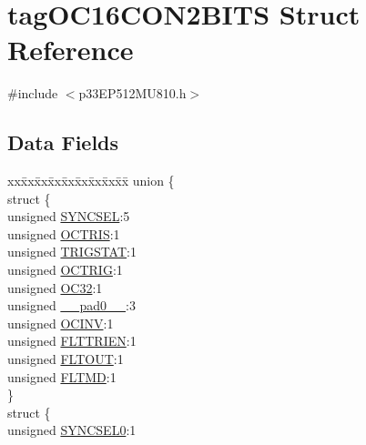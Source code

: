 \hypertarget{structtag_o_c16_c_o_n2_b_i_t_s}{}\section{tag\+O\+C16\+C\+O\+N2\+B\+I\+TS Struct Reference}
\label{structtag_o_c16_c_o_n2_b_i_t_s}


{\ttfamily \#include $<$p33\+E\+P512\+M\+U810.\+h$>$}

\subsection*{Data Fields}
\begin{DoxyCompactItemize}
\item 
\begin{tabbing}
xx\=xx\=xx\=xx\=xx\=xx\=xx\=xx\=xx\=\kill
union \{\\
\>struct \{\\
\>\>unsigned \hyperlink{structtag_o_c16_c_o_n2_b_i_t_s_a35fbbe11485c2615ed27535b62c3fa35}{SYNCSEL}:5\\
\>\>unsigned \hyperlink{structtag_o_c16_c_o_n2_b_i_t_s_ab849a74c6179282ed6b06cc047c80544}{OCTRIS}:1\\
\>\>unsigned \hyperlink{structtag_o_c16_c_o_n2_b_i_t_s_ab379549de54ac93ad4aa73686c34cb7c}{TRIGSTAT}:1\\
\>\>unsigned \hyperlink{structtag_o_c16_c_o_n2_b_i_t_s_a8d2cf9b996ef2b9079defa8950de798c}{OCTRIG}:1\\
\>\>unsigned \hyperlink{structtag_o_c16_c_o_n2_b_i_t_s_af52e127483a703e0fa84c7d4f1de0df4}{OC32}:1\\
\>\>unsigned \hyperlink{structtag_o_c16_c_o_n2_b_i_t_s_adf71f3d8410c1f1dbbc96680a92c49af}{\_\_pad0\_\_}:3\\
\>\>unsigned \hyperlink{structtag_o_c16_c_o_n2_b_i_t_s_a301004fca40c8d19d418866c92c19a06}{OCINV}:1\\
\>\>unsigned \hyperlink{structtag_o_c16_c_o_n2_b_i_t_s_ab979b75e02643aa840fb6ee50e0c30fa}{FLTTRIEN}:1\\
\>\>unsigned \hyperlink{structtag_o_c16_c_o_n2_b_i_t_s_ae466664b094d9c830e9ce20b86d7907f}{FLTOUT}:1\\
\>\>unsigned \hyperlink{structtag_o_c16_c_o_n2_b_i_t_s_a245ca3019d6c6ccbfb09f1c821146bb5}{FLTMD}:1\\
\>\} \\
\>struct \{\\
\>\>unsigned \hyperlink{structtag_o_c16_c_o_n2_b_i_t_s_a3b5df3154fde5141e6ac0156425ff8b4}{SYNCSEL0}:1\\

\end{tabbing}
\end{DoxyCompactItemize}
